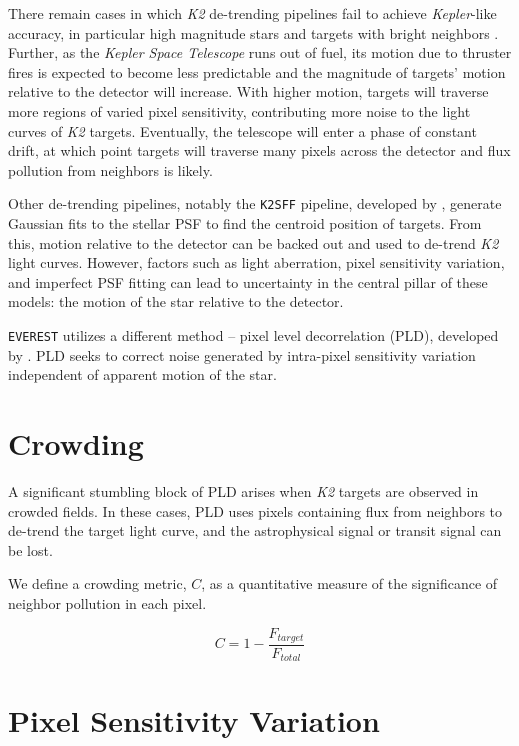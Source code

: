 \documentclass[12pt,preprint]{aastex}
\begin{document}
There remain cases in which \textit{K2} de-trending pipelines fail to achieve \textit{Kepler}-like accuracy, in particular high magnitude stars and targets with bright neighbors \citep{2017arXiv170205488L}. Further, as the \textit{Kepler Space Telescope} runs out of fuel, its motion due to thruster fires is expected to become less predictable and the magnitude of targets' motion relative to the detector will increase. With higher motion, targets will traverse more regions of varied pixel sensitivity, contributing more noise to the light curves of \textit{K2} targets. Eventually, the telescope will enter a phase of constant drift, at which point targets will traverse many pixels across the detector and flux pollution from neighbors is likely. 

Other de-trending pipelines, notably the \texttt{K2SFF} pipeline, developed by \cite{2014PASP..126..948V}, generate Gaussian fits to the stellar PSF to find the centroid position of targets. From this, motion relative to the detector can be backed out and used to de-trend \textit{K2} light curves. However, factors such as light aberration, pixel sensitivity variation, and imperfect PSF fitting can lead to uncertainty in the central pillar of these models: the motion of the star relative to the detector.

\texttt{EVEREST} utilizes a different method -- pixel level decorrelation (PLD), developed by \cite{0004-637X-805-2-132}. PLD seeks to correct noise generated by intra-pixel sensitivity variation independent of apparent motion of the star.

\section{Crowding}

A significant stumbling block of PLD arises when \textit{K2} targets are observed in crowded fields. In these cases, PLD uses pixels containing flux from neighbors to de-trend the target light curve, and the astrophysical signal or transit signal can be lost. 

We define a crowding metric, $C$, as a quantitative measure of the significance of neighbor pollution in each pixel. 

\[
\tag{1}
C = 1 - \frac{F_{target}}{F_{total}}
\]

\section{Pixel Sensitivity Variation}
\end{document}
